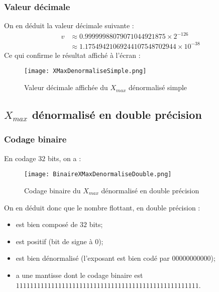 \documentclass[a4paper, titlepage]{livret} %
\begin{document}
				\subsubsection{Valeur décimale}
					On en déduit la valeur décimale suivante :
					\[\begin{aligned}
						v & \approx 0.99999988079071044921875 \times 2^{-126}\\
						  & \approx 1.17549421069244107548702944 \times 10^{-38}
					\end{aligned}\]
					Ce qui confirme le résultat affiché à l'écran :
					\begin{figure}[!h]
						\centering
  							\texttt{[image: XMaxDenormaliseSimple.png]}
  							\caption{Valeur décimale affichée du $X_{max}$ dénormalisé simple}
					\end{figure}

			\subsection{$X_{max}$ dénormalisé en double précision}
				\subsubsection{Codage binaire}
					En codage $32$ bits, on a :
					\begin{figure}[!h]
						\centering
  							\texttt{[image: BinaireXMaxDenormaliseDouble.png]}
  							\caption{Codage binaire du $X_{max}$ dénormalisé en double précision}
					\end{figure}

					On en déduit donc que le nombre flottant, en double précision :
					\begin{itemize}
						\item est bien composé de $32$ bits;
						\item est positif (bit de signe à 0);
						\item est bien dénormalisé (l'exposant est bien codé par $00000000000$);
						\item a une mantisse dont le codage binaire est $11111111 11111111 11111111 11111111 11111111 11111111 1111$.
					\end{itemize}
\end{document}
